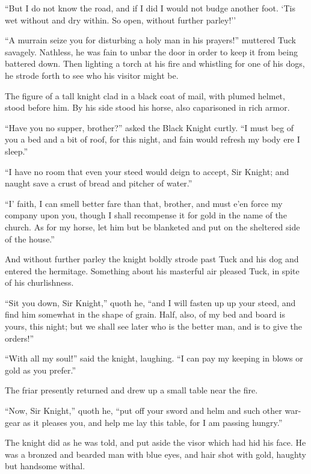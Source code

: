 ``But I do not know the road, and if I did I would not budge another
foot. `Tis wet without and dry within. So open, without further
parley!''

``A murrain seize you for disturbing a holy man in his prayers!''
muttered Tuck savagely. Nathless, he was fain to unbar the door in order
to keep it from being battered down. Then lighting a torch at his fire
and whistling for one of his dogs, he strode forth to see who his
visitor might be.

The figure of a tall knight clad in a black coat of mail, with plumed
helmet, stood before him. By his side stood his horse, also caparisoned
in rich armor.

``Have you no supper, brother?'' asked the Black Knight curtly. ``I must
beg of you a bed and a bit of roof, for this night, and fain would
refresh my body ere I sleep.''

``I have no room that even your steed would deign to accept, Sir Knight;
and naught save a crust of bread and pitcher of water.''

``I' faith, I can smell better fare than that, brother, and must e'en
force my company upon you, though I shall recompense it for gold in the
name of the church. As for my horse, let him but be blanketed and put on
the sheltered side of the house.''

And without further parley the knight boldly strode past Tuck and his
dog and entered the hermitage. Something about his masterful air pleased
Tuck, in spite of his churlishness.

``Sit you down, Sir Knight,'' quoth he, ``and I will fasten up up your
steed, and find him somewhat in the shape of grain. Half, also, of my
bed and board is yours, this night; but we shall see later who is the
better man, and is to give the orders!''

``With all my soul!'' said the knight, laughing. ``I can pay my keeping
in blows or gold as you prefer.''

The friar presently returned and drew up a small table near the fire.

``Now, Sir Knight,'' quoth he, ``put off your sword and helm and such
other war-gear as it pleases you, and help me lay this table, for I am
passing hungry.''

The knight did as he was told, and put aside the visor which had hid his
face. He was a bronzed and bearded man with blue eyes, and hair shot
with gold, haughty but handsome withal.


